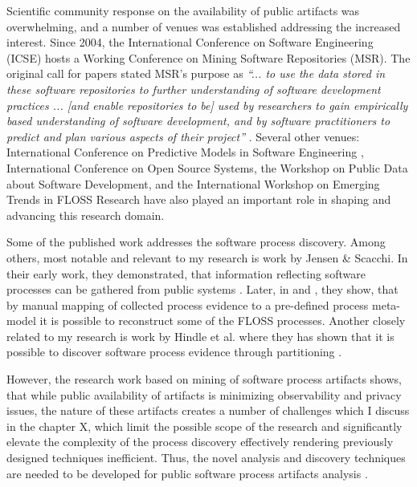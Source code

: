 
Scientific community response on the availability of public artifacts was overwhelming, and a number of 
venues was established addressing the increased interest. 
Since 2004, the International Conference on Software Engineering (ICSE) hosts a Working Conference on 
Mining Software Repositories (MSR). The original call for papers stated MSR's purpose as 
\textit{``... to use the data stored in these software repositories to further understanding of software 
development practices ... [and enable repositories to be] used by researchers to gain empirically based 
understanding of software development, and by software practitioners to predict and plan various aspects 
of their project''} \cite{msr2004} \cite{citeulike:7853299}. 
Several other venues: International Conference on Predictive Models in Software Engineering \cite{promise12}, 
International Conference on Open Source Systems, the Workshop on Public Data about Software Development, 
and the International Workshop on Emerging Trends in FLOSS Research have also played
an important role in shaping and advancing this research domain.

Some of the published work addresses the software process discovery. Among others, most notable and 
relevant to my research is work by Jensen \& Scacchi. In their early work, they demonstrated, that 
information reflecting software processes can be gathered from public systems \cite{citeulike:12550640}. 
Later, in \cite{citeulike:5043664} and \cite{citeulike:5128808}, they show, that by manual mapping of 
collected process evidence to a pre-defined process meta-model it is possible to reconstruct some 
of the FLOSS processes. 
Another closely related to my research is work by Hindle et al. where they has shown that it is possible to 
discover software process evidence through partitioning \cite{citeulike:10377366}.

However, the research work based on mining of software process artifacts shows, that while public availability 
of artifacts is minimizing observability and privacy issues, the nature of these artifacts creates a number of 
challenges which I discuss in the chapter X, which limit the possible scope of the research and significantly 
elevate the complexity of the process discovery effectively rendering previously designed techniques inefficient.
Thus, the novel analysis and discovery techniques are needed to be developed for public software process artifacts 
analysis \cite{citeulike:7853299}.


